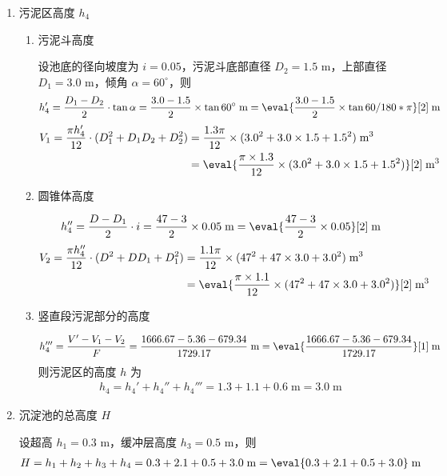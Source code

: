 \begin{enumerate}
	\item 污泥区高度 $h_4$
	\begin{enumerate}
		\item 污泥斗高度
		
		设池底的径向坡度为 $i = 0.05$，污泥斗底部直径 $D_2= 1.5$ m，上部直径 $D_1=3.0$ m，倾角 $\alpha=60^{\circ}$，则
		\begin{align}
			h_4' =\dfrac{D_1-D_2}{2}\cdot \tan{\alpha} = \dfrac{3.0-1.5}{2}\times \tan{60^{\circ}} \;\text{m} =\eval{\dfrac{3.0-1.5}{2}\times \tan{60/180*\pi}}[2] \;\text{m}
		\end{align}
		\begin{align}
			V_1 = \dfrac{\pi h_4'}{12}\cdot(D_1^2+D_1D_2+D_2^2) &= \dfrac{1.3 \pi}{12}\times(3.0^2+3.0\times 1.5+1.5^2) \;\text{m$^3$} \\
			&= \eval{\dfrac{\pi \times 1.3}{12}\times(3.0^2+3.0\times 1.5+1.5^2)}[2] \;\text{m$^3$} \notag
		\end{align}

		\item 圆锥体高度
		
		\begin{align}
			h_4'' =\dfrac{D-D_1}{2}\cdot i = \dfrac{47-3}{2}\times 0.05 \;\text{m} =\eval{\dfrac{47-3}{2}\times 0.05}[2] \;\text{m}
		\end{align}
		\begin{align}
			V_2 = \dfrac{\pi h_4''}{12}\cdot(D^2+DD_1+D_1^2) &= \dfrac{1.1 \pi}{12}\times(47^2+47\times 3.0+3.0^2) \;\text{m$^3$} \\
			&= \eval{\dfrac{\pi \times 1.1}{12}\times(47^2+47\times 3.0+3.0^2)}[2] \;\text{m$^3$} \notag
		\end{align}

		\item 竖直段污泥部分的高度
		
		\begin{align}
			h_4''' =\dfrac{V'-V_1-V_2}{F} = \dfrac{1666.67-5.36-679.34}{1729.17} \;\text{m} =\eval{\dfrac{1666.67-5.36-679.34}{1729.17}}[1] \;\text{m}
		\end{align}
		则污泥区的高度 $h$ 为
		\begin{align}
			h_4=h_4'+h_4''+h_4''' = 1.3+1.1+0.6 \;\text{m} =3.0 \;\text{m}
		\end{align}
	\end{enumerate}

	\item 沉淀池的总高度 $H$
	
	设超高 $h_1=0.3$ m，缓冲层高度 $h_3=0.5$ m，则
	\begin{align}
		H=h_1+h_2+h_3+h_4 = 0.3+2.1+0.5+3.0 \;\text{m} =\eval{0.3+2.1+0.5+3.0} \;\text{m}
	\end{align}
\end{enumerate}


